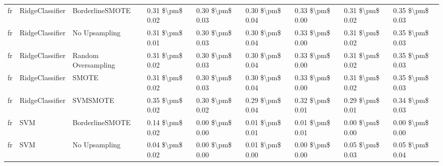 \begin{tabular}{lllllllll}
      fr &                 RidgeClassifier &               BorderlineSMOTE & 0.31 \$\textbackslash pm\$ 0.02 &           0.30 \$\textbackslash pm\$ 0.03 &       0.30 \$\textbackslash pm\$ 0.04 &        0.33 \$\textbackslash pm\$ 0.00 &                         0.31 \$\textbackslash pm\$ 0.02 &     0.35 \$\textbackslash pm\$ 0.03 \\
      fr &                 RidgeClassifier &                 No Upsampling & 0.31 \$\textbackslash pm\$ 0.01 &           0.30 \$\textbackslash pm\$ 0.03 &       0.30 \$\textbackslash pm\$ 0.04 &        0.33 \$\textbackslash pm\$ 0.00 &                         0.31 \$\textbackslash pm\$ 0.02 &     0.35 \$\textbackslash pm\$ 0.03 \\
      fr &                 RidgeClassifier &           Random Oversampling & 0.31 \$\textbackslash pm\$ 0.02 &           0.30 \$\textbackslash pm\$ 0.03 &       0.30 \$\textbackslash pm\$ 0.04 &        0.33 \$\textbackslash pm\$ 0.00 &                         0.31 \$\textbackslash pm\$ 0.02 &     0.35 \$\textbackslash pm\$ 0.03 \\
      fr &                 RidgeClassifier &                         SMOTE & 0.31 \$\textbackslash pm\$ 0.02 &           0.30 \$\textbackslash pm\$ 0.03 &       0.30 \$\textbackslash pm\$ 0.04 &        0.33 \$\textbackslash pm\$ 0.00 &                         0.31 \$\textbackslash pm\$ 0.02 &     0.35 \$\textbackslash pm\$ 0.03 \\
      fr &                 RidgeClassifier &                      SVMSMOTE & 0.35 \$\textbackslash pm\$ 0.02 &           0.30 \$\textbackslash pm\$ 0.02 &       0.29 \$\textbackslash pm\$ 0.04 &        0.32 \$\textbackslash pm\$ 0.01 &                         0.29 \$\textbackslash pm\$ 0.01 &     0.34 \$\textbackslash pm\$ 0.03 \\
      fr &                             SVM &               BorderlineSMOTE & 0.14 \$\textbackslash pm\$ 0.02 &           0.00 \$\textbackslash pm\$ 0.00 &       0.01 \$\textbackslash pm\$ 0.01 &        0.01 \$\textbackslash pm\$ 0.01 &                         0.00 \$\textbackslash pm\$ 0.00 &     0.00 \$\textbackslash pm\$ 0.00 \\
      fr &                             SVM &                 No Upsampling & 0.04 \$\textbackslash pm\$ 0.02 &           0.00 \$\textbackslash pm\$ 0.00 &       0.01 \$\textbackslash pm\$ 0.00 &        0.00 \$\textbackslash pm\$ 0.00 &                         0.05 \$\textbackslash pm\$ 0.03 &     0.05 \$\textbackslash pm\$ 0.04 \\

\end{tabular}
